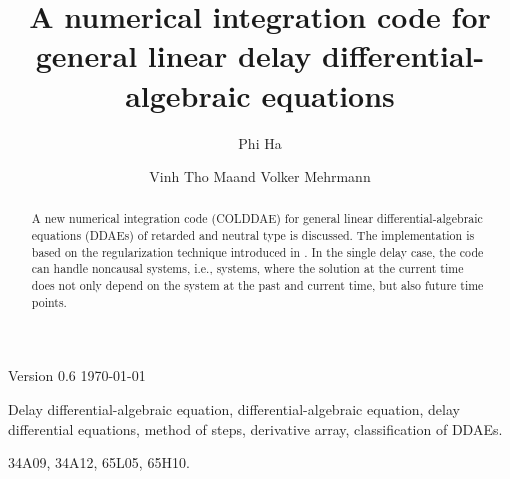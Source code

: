 \documentclass[final,reqno]{siamltex}
\begin{document}
\title{A numerical integration code for general linear delay differential-algebraic equations\footnotemark[1]}

\author{Phi Ha\footnotemark[2] \and Vinh Tho Ma\footnotemark[2] and Volker Mehrmann\footnotemark[2]}

\renewcommand{\thefootnote}{\fnsymbol{footnote}}


\maketitle

\newcommand{\thedate}{Version 0.6 \quad \today}

\begin{center}
\thedate
\end{center}

\vskip 0.2cm

\begin{abstract}
A new numerical integration code (COLDDAE) for general linear differential-algebraic equations
(DDAEs) of retarded and neutral type is discussed. The implementation is based on the regularization technique introduced in
\cite{HaM14}. In the single delay case, the code can handle noncausal systems, i.e., systems, where the
solution at the current time does not only depend on the system at the past and current time,
but also future time points.
\end{abstract}

\begin{keywords} Delay differential-algebraic equation, differential-algebraic equation, delay differential
equations, method of steps, derivative array, classification of DDAEs.
\end{keywords}

\begin{AMS}
34A09, 34A12, 65L05, 65H10.
\end{AMS}

\pagestyle{myheadings}
\thispagestyle{plain}
\end{document}
